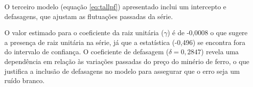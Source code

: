 \documentclass[a4paper,12pt]{article}[abntex2]
\begin{document}
\begin{table}[H] \centering 
  \caption{Resultados do Teste ADF do Log dos Preços do Ferro (TIO=F) Apenas com Defasagens} 
  \renewcommand{\arraystretch}{0.9} %
 \label{tab:adfferro}
\end{table}

O terceiro modelo (equação \ref{eq:tallpf}) apresentado inclui um intercepto e defasagens, que ajustam as flutuações passadas da série.

O valor estimado para o coeficiente da raiz unitária ($\gamma$) é de -0,0008 o que sugere a presença de raiz unitária na série, já que a estatística (-0,496) se encontra fora do intervalo de confiança. O coeficiente de defasagem ($\delta = 0,2847$) revela uma dependência em relação às variações passadas do preço do minério de ferro, o que justifica a inclusão de defasagens no modelo para assegurar que o erro seja um ruído branco.
\end{document}
